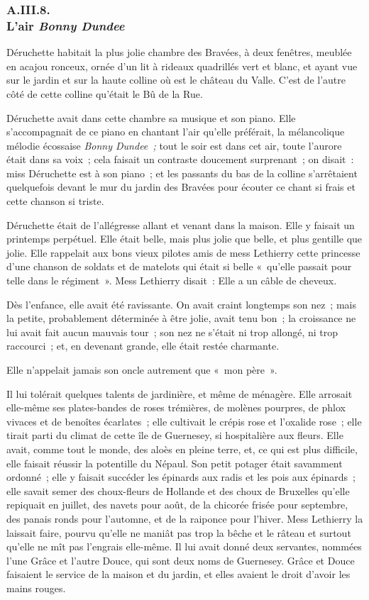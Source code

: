 \documentclass[french,twoside]{book} %
\begin{document}
 \subsubsection[{A.III.8. L’air Bonny Dundee}]{A.III.8. \\
L’air \emph{Bonny Dundee}}
\noindent Déruchette habitait la plus jolie chambre des Bravées, à deux fenêtres, meublée en acajou ronceux, ornée d’un lit à rideaux quadrillés vert et blanc, et ayant vue sur le jardin et sur la haute colline où est le château du Valle. C’est de l’autre côté de cette colline qu’était le Bû de la Rue.\par
Déruchette avait dans cette chambre sa musique et son piano. Elle s’accompagnait de ce piano en chantant l’air qu’elle préférait, la mélancolique mélodie écossaise \emph{Bonny Dundee ;} tout le soir est dans cet air, toute l’aurore était dans sa voix ; cela faisait un contraste doucement surprenant ; on disait : miss Déruchette est à son piano ; et les passants du bas de la colline s’arrêtaient quelquefois devant le mur du jardin des Bravées pour écouter ce chant si frais et cette chanson si triste.\par
Déruchette était de l’allégresse allant et venant dans la maison. Elle y faisait un printemps perpétuel.  Elle était belle, mais plus jolie que belle, et plus gentille que jolie. Elle rappelait aux bons vieux pilotes amis de mess Lethierry cette princesse d’une chanson de soldats et de matelots qui était si belle « qu’elle passait pour telle dans le régiment ». Mess Lethierry disait : Elle a un câble de cheveux.\par
Dès l’enfance, elle avait été ravissante. On avait craint longtemps son nez ; mais la petite, probablement déterminée à être jolie, avait tenu bon ; la croissance ne lui avait fait aucun mauvais tour ; son nez ne s’était ni trop allongé, ni trop raccourci ; et, en devenant grande, elle était restée charmante.\par
Elle n’appelait jamais son oncle autrement que « mon père ».\par
Il lui tolérait quelques talents de jardinière, et même de ménagère. Elle arrosait elle-même ses plates-bandes de roses trémières, de molènes pourpres, de phlox vivaces et de benoîtes écarlates ; elle cultivait le crépis rose et l’oxalide rose ; elle tirait parti du climat de cette île de Guernesey, si hospitalière aux fleurs. Elle avait, comme tout le monde, des aloès en pleine terre, et, ce qui est plus difficile, elle faisait réussir la potentille du Népaul. Son petit potager était savamment ordonné ; elle y faisait succéder les épinards aux radis et les pois aux épinards ; elle savait semer des choux-fleurs de Hollande et des choux de Bruxelles qu’elle repiquait en juillet, des navets pour août, de la chicorée frisée pour septembre, des panais ronds pour l’automne, et de la raiponce pour l’hiver. Mess Lethierry la laissait faire, pourvu qu’elle ne maniât  pas trop la bêche et le râteau et surtout qu’elle ne mît pas l’engrais elle-même. Il lui avait donné deux servantes, nommées l’une Grâce et l’autre Douce, qui sont deux noms de Guernesey. Grâce et Douce faisaient le service de la maison et du jardin, et elles avaient le droit d’avoir les mains rouges.\par
\end{document}
